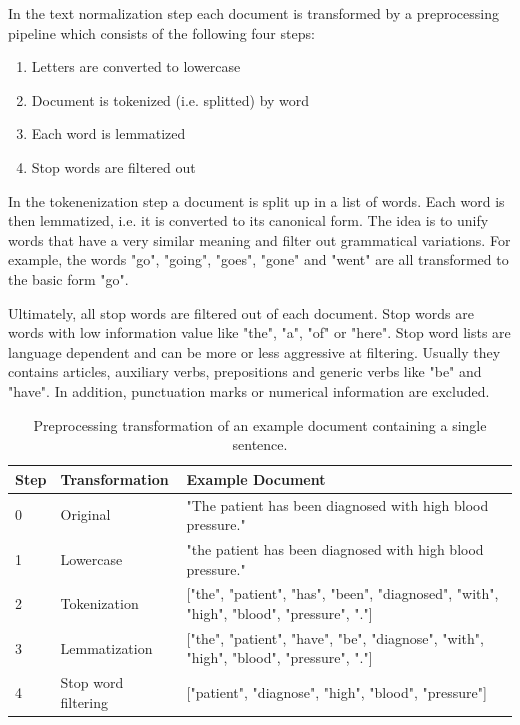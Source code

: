 In the text normalization step each document is transformed by a preprocessing pipeline which consists of the following four steps:

\begin{enumerate} 
	\item Letters are converted to lowercase
	\item Document is tokenized (i.e. splitted) by word
	\item Each word is lemmatized
	\item Stop words are filtered out
\end{enumerate}

In the tokenenization step a document is split up in a list of words.
Each word is then lemmatized, i.e. it is converted to its canonical form.
The idea is to unify words that have a very similar meaning and filter out grammatical variations.
For example, the words  "go", "going", "goes", "gone" and "went" are all transformed to the basic form "go".

Ultimately, all stop words are filtered out of each document.
Stop words are words with low information value like "the", "a", "of" or "here".
Stop word lists are language dependent and can be more or less aggressive at filtering.
Usually they contains articles, auxiliary verbs, prepositions and generic verbs like "be" and "have".
In addition, punctuation marks or numerical information are excluded.

\begin{table}[!htbp]
	\begin{tabularx}{\textwidth}{l l p{9.8cm}}
		\toprule
		\textbf{Step} & \textbf{Transformation} & \textbf{Example Document}                                                       \\ \midrule
		0             & Original       & "The patient has been diagnosed with high blood pressure." \\
		1             & Lowercase               & "the patient has been diagnosed with high blood pressure." \\
		2 & Tokenization  & {[}"the", "patient", "has", "been", "diagnosed", "with", "high", "blood", "pressure", "."{]} \\
		3 & Lemmatization & {[}"the", "patient", "have", "be", "diagnose", "with", "high", "blood", "pressure", "."{]}   \\
		4             & Stop word filtering     & {[}"patient", "diagnose", "high", "blood", "pressure"{]} \\ \bottomrule
	\end{tabularx}
	\caption{Preprocessing transformation of an example document containing a single sentence.}
	\label{tab:text-preprocessing}
\end{table}


